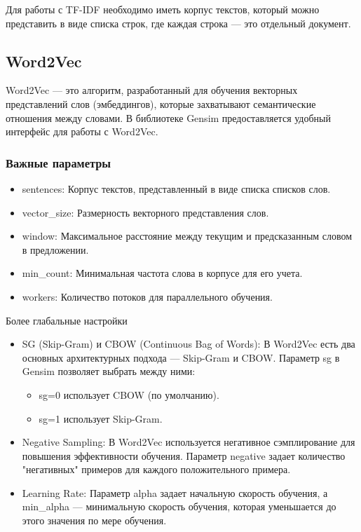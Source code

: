 			Для работы с TF-IDF необходимо иметь корпус текстов, который можно представить в виде списка строк, где каждая строка — это отдельный документ.
			
 
	\subsection{Word2Vec}
 		Word2Vec — это алгоритм, разработанный для обучения векторных представлений слов (эмбеддингов), которые захватывают семантические отношения между словами. В библиотеке Gensim предоставляется удобный интерфейс для работы с Word2Vec.
		
		\subsubsection{Важные параметры}	
			\begin{itemize}
				\item sentences: Корпус текстов, представленный в виде списка списков слов.
				\item vector\_size: Размерность векторного представления слов.
				\item window: Максимальное расстояние между текущим и предсказанным словом в предложении.
				\item min\_count: Минимальная частота слова в корпусе для его учета.
				\item workers: Количество потоков для параллельного обучения.
			\end{itemize}
		
			Более глабальные настройки
			\begin{itemize}
				\item SG (Skip-Gram) и CBOW (Continuous Bag of Words): В Word2Vec есть два основных архитектурных подхода — Skip-Gram и CBOW. Параметр sg в Gensim позволяет выбрать между ними:
					\begin{itemize}
						\item sg=0 использует CBOW (по умолчанию).
						\item sg=1 использует Skip-Gram.
					\end{itemize}
				\item Negative Sampling: В Word2Vec используется негативное сэмплирование для повышения эффективности обучения. Параметр negative задает количество "негативных" примеров для каждого положительного примера.
				\item Learning Rate: Параметр alpha задает начальную скорость обучения, а min\_alpha — минимальную скорость обучения, которая уменьшается до этого значения по мере обучения.
			\end{itemize}
		
